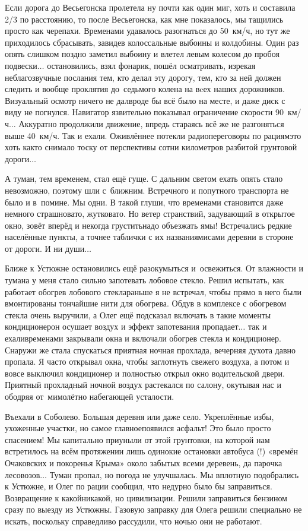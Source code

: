 Если дорога до Весьегонска пролетела ну почти как один миг, хоть и составила 2/3 по расстоянию, то после Весьегонска, как мне показалось, мы тащились просто как черепахи. Временами удавалось разогнаться до 50~км/ч, но тут же приходилось сбрасывать, завидев колоссальные выбоины и колдобины. Один раз опять слишком поздно заметил выбоину и влетел левым колесом до пробоя подвески$\ldots$ остановились, взял фонарик, пошёл осматривать, изрекая неблагозвучные послания тем, кто делал эту дорогу, тем, кто за ней должен следить и вообще проклятия до~седьмого колена на вcех наших дорожников. Визуальный осмотр ничего не дал\mdash вроде бы всё было на месте, и даже диск с виду не погнулся. Навигатор язвительно показывал ограничение скорости 90~км/ч$\ldots$ Аккуратно продолжили движение, впредь стараясь всё же не разгоняться выше 40~км/ч. Так и ехали. Оживлённее потекли радиопереговоры по рациям\mdash это хоть как\sdash то снимало тоску от перспективы сотни километров разбитой грунтовой дороги$\ldots$

А туман, тем временем, стал ещё гуще. С дальним светом ехать опять стало невозможно, поэтому шли с~ближним. Встречного и попутного транспорта не было и в~помине. Мы одни. В такой глуши, что временами становится даже немного страшновато, жутковато. Но ветер странствий, задувающий в открытое окно, зовёт вперёд и некогда грустить\mdash надо объезжать ямы! Встречались редкие населённые пункты, а точнее таблички с их названиями\mdash сами деревни в стороне от дороги. И ни души$\ldots$

Ближе к Устюжне остановились ещё разок\mdash умыться и~освежиться. От влажности и тумана у меня стало сильно запотевать лобовое стекло. Решил испытать, как работает обогрев лобового стекла\mdash раньше я не встречал, чтобы прямо в него были вмонтированы тончайшие нити для обогрева. Обдув в комплексе с обогревом стекла очень выручили, а Олег ещё подсказал включать в такие моменты кондиционер\mdash он осушает воздух и эффект запотевания пропадает$\ldots$ так и ехали\mdash временами закрывали окна и включали обогрев стекла и кондиционер. Снаружи же стала спускаться приятная ночная прохлада, вечерняя духота давно пропала. Я часто открывал окна, чтобы заглотнуть свежего воздуха, а потом и вовсе выключил кондиционер и полностью открыл окно водительской двери. Приятный прохладный ночной воздух растекался по салону, окутывая нас и ободряя от~мимолётно набегающей усталости.

Въехали в Соболево. Большая деревня или даже село. Укреплённые избы, ухоженные участки, но самое главное\mdash появился асфальт! Это было просто спасением! Мы капитально приуныли от этой грунтовки, на которой нам встретилось на всём протяжении лишь одинокие остановки автобуса (!) «времён Очаковских и покоренья Крыма» около забытых всеми деревень, да парочка лесовозов$\ldots$ Туман пропал, но погода не улучшалась. Мы вплотную подобрались к Устюжне, и Олег по рации сообщил, что недурно было бы заправиться. Возвращение к какой\sdash никакой, но цивилизации. Решили заправиться бензином сразу по выезду из Устюжны. Газовую заправку для Олега решили специально не искать, поскольку справедливо рассудили, что ночью они не работают.

